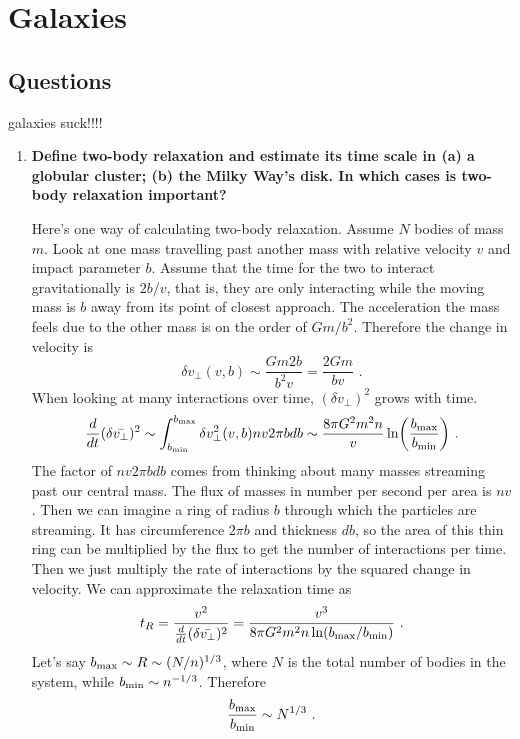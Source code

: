 \section{Galaxies}
\subsection{Questions}
galaxies suck!!!!
\begin{enumerate}
\item \textbf{Define two-body relaxation and estimate its time scale in (a) a globular cluster; (b)
      the Milky Way's disk. In which cases is two-body relaxation important?}
      
      Here's one way of calculating two-body relaxation. Assume $N$ bodies of mass $m$. Look at one mass travelling past another mass with relative velocity $v$ and impact parameter $b$. Assume that the time for the two to interact gravitationally is $2b/v$, that is, they are only interacting while the moving mass is $b$ away from its point of closest approach. The acceleration the mass feels due to the other mass is on the order of $Gm/b^2$. Therefore the change in velocity is
      \begin{equation}
      \delta v_\perp (v,b) \sim \frac{Gm2b}{b^2v} = \frac{2Gm}{bv}\,\,.
      \end{equation}
      When looking at many interactions over time, $(\delta v_\perp)^2$ grows with time.
      \begin{equation}
      \frac{d}{dt}(\delta \bar{v_\perp})^2 \sim \int^{b_{\rm max}}_{b_{\rm min}}\delta v_\perp^2(v,b) n v 2 \pi b db \sim \frac{8 \pi G^2 m^2 n}{v} \ln \biggl( \frac{b_{\rm max}}{b_{\rm min}} \biggr) \,\, .
      \end{equation}
      The factor of $n v 2 \pi b db$ comes from thinking about many masses streaming past our central mass. The flux of masses in number per second per area is $nv$. Then we can imagine a ring of radius $b$ through which the particles are streaming. It has circumference $2 \pi b$ and thickness $db$, so the area of this thin ring can be multiplied by the flux to get the number of interactions per time. Then we just multiply the rate of interactions by the squared change in velocity. We can approximate the relaxation time as
      \begin{equation}
      t_R = \frac{v^2}{\frac{d}{dt}(\delta \bar{v_\perp})^2} = \frac{v^3}{8 \pi G^2 m^2 n \ln(b_{\rm max}/b_{\rm min})} \,\,.
      \end{equation}
      Let's say $b_{\rm max} \sim R \sim (N/n)^{1/3}$, where $N$ is the total
      number of bodies in the system, while $b_{\rm min} \sim n^{-1/3}$. Therefore
      \begin{equation}
      \frac{b_{\rm max}}{b_{\rm min}} \sim N^{1/3}\,\,.
      \end{equation}
      

\end{enumerate}
